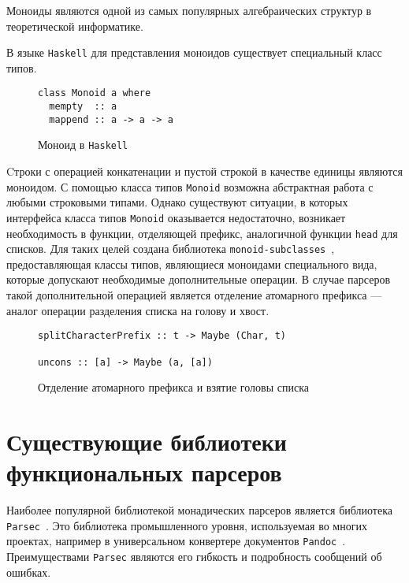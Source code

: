 Моноиды являются одной из самых популярных алгебраических структур в 
теоретической информатике.

В языке \lstinline{Haskell} для представления моноидов существует специальный 
класс типов.

\begin{figure}[h]
\begin{lstlisting}
class Monoid a where
  mempty  :: a
  mappend :: a -> a -> a
\end{lstlisting}
\caption{Моноид в \lstinline{Haskell}}
\label{listing:Monoid}
\end{figure}

Cтроки с операцией конкатенации и пустой строкой в качестве единицы являются 
моноидом. С помощью класса типов \lstinline{Monoid} возможна абстрактная работа 
с любыми строковыми типами. Однако существуют ситуации, в которых интерфейса 
класса типов \lstinline{Monoid} оказывается недостаточно, возникает 
необходимость в функции, отделяющей префикс, аналогичной функции 
\lstinline{head} для списков. Для таких целей создана библиотека 
\lstinline{monoid-subclasses}~\autocite{MonoidSubclasses}, предоставляющая 
классы типов, являющиеся моноидами специального вида, которые допускают 
необходимые дополнительные операции. В случае парсеров такой дополнительной 
операцией является отделение атомарного префикса --- аналог операции разделения 
списка на голову и хвост.

\begin{figure}[h]
\begin{lstlisting}
splitCharacterPrefix :: t -> Maybe (Char, t)

uncons :: [a] -> Maybe (a, [a])
\end{lstlisting}
\caption{Отделение атомарного префикса и взятие головы списка}
\label{listing:Monoid}
\end{figure}

\section{Существующие библиотеки функциональных парсеров}

Наиболее популярной библиотекой монадических парсеров является библиотека 
\lstinline{Parsec}~\autocite{Parsec}. Это библиотека промышленного уровня, 
используемая во многих проектах, например в универсальном конвертере документов 
\lstinline{Pandoc}~\autocite{Pandoc}. Преимуществами \lstinline{Parsec} являются
 его гибкость и подробность сообщений об ошибках.

